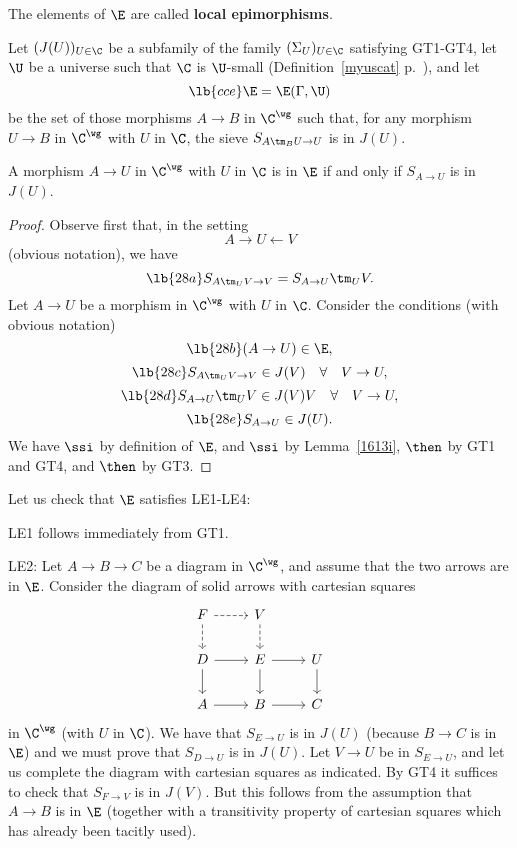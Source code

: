 \documentclass[12pt]{article}
\theoremstyle{remark}
\theoremstyle{definition}
\begin{document}
The elements of $\E$ are called \textbf{local epimorphisms}.

Let $(J(U))_{U\in\C}$ be a subfamily of the family $(\Sigma_U)_{U\in\C}$ satisfying GT1\--GT4, let $\U$ be a universe such that $\C$ is $\U$-small (Definition~\ref{myuscat} p.~), and let 
\begin{equation}\lb{cce}
\E=\E(\Gamma,\U)
\end{equation} 
be the set of those morphisms $A\to B$ in $\C^\wg$ such that, for any morphism $U\to B$ in $\C^\wg$ with $U$ in $\C$, the sieve $S_{A\tm_BU\to U}$ is in $J(U)$. 

\begin{lem}
A morphism $A\to U$ in $\C^\wg$ with $U$ in $\C$ is in $\E$ if and only if $S_{A\to U}$ is in $J(U)$. 
\end{lem}

\begin{proof}
Observe first that, in the setting 
$$
A\to U\leftarrow V
$$ 
(obvious notation), we have 
\begin{equation}\lb{28a}
S_{A\tm_UV\to V}=S_{A\to U}\tm_UV.
\end{equation} 
Let $A\to U$ be a morphism in $\C^\wg$ with $U$ in $\C$. Consider the conditions (with obvious notation) 
\begin{equation}\lb{28b}
(A\to U)\in\E,
\end{equation}
\begin{equation}\lb{28c}
S_{A\tm_UV\to V}\in J(V)\quad\forall\quad V\to U,
\end{equation}
\begin{equation}\lb{28d}
S_{A\to U}\tm_UV\in J(V)V\quad\forall\quad V\to U,
\end{equation}
\begin{equation}\lb{28e}
S_{A\to U}\in J(U).
\end{equation} 
We have  $\ssi$  by definition of $\E$, and  $\ssi$  by Lemma~\ref{1613i},  $\then$  by GT1 and GT4, and  $\then$  by GT3.
\end{proof}

Let us check that $\E$ satisfies LE1-LE4:

\nn LE1 follows immediately from GT1.

\nn LE2: Let $A\to B\to C$ be a diagram in $\C^\wg$, and assume that the two arrows are in $\E$. Consider the diagram of solid arrows with cartesian squares 
$$
\begin{tikzcd}
F\ar[dashed]{r}\ar[dashed]{d}&V\ar[dashed]{d}\\ 
D\ar{r}\ar{d}&E\ar{r}\ar{d}&U\ar{d}\\ 
A\ar{r}&B\ar{r}&C
\end{tikzcd}
$$
in $\C^\wg$ (with $U$ in $\C$). We have that $S_{E\to U}$ is in $J(U)$ (because $B\to C$ is in $\E$) and we must prove that $S_{D\to U}$ is in $J(U)$. Let $V\to U$ be in $S_{E\to U}$, and let us complete the diagram with cartesian squares as indicated. By GT4 it suffices to check that $S_{F\to V}$ is in $J(V)$. But this follows from the assumption that $A\to B$ is in $\E$ (together with a transitivity property of cartesian squares which has already been tacitly used).
\end{document}
